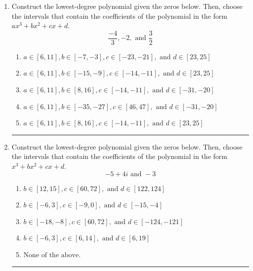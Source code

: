 \documentclass[14pt]{extbook}
\newcommand{\litem}[1]{\item#1\hspace*{-1cm}\rule{\textwidth}{0.4pt}}
\begin{document}
\begin{enumerate}
{\begin{enumerate}[label=\Alph*.]
\end{enumerate} }
\litem{
Construct the lowest-degree polynomial given the zeros below. Then, choose the intervals that contain the coefficients of the polynomial in the form $ax^3+bx^2+cx+d$.\[ \frac{-4}{3}, -2, \text{ and } \frac{3}{2} \]\begin{enumerate}[label=\Alph*.]
\item \( a \in [6, 11], b \in [-7, -3], c \in [-23, -21], \text{ and } d \in [23, 25] \)
\item \( a \in [6, 11], b \in [-15, -9], c \in [-14, -11], \text{ and } d \in [23, 25] \)
\item \( a \in [6, 11], b \in [8, 16], c \in [-14, -11], \text{ and } d \in [-31, -20] \)
\item \( a \in [6, 11], b \in [-35, -27], c \in [46, 47], \text{ and } d \in [-31, -20] \)
\item \( a \in [6, 11], b \in [8, 16], c \in [-14, -11], \text{ and } d \in [23, 25] \)

\end{enumerate} }
\litem{
Construct the lowest-degree polynomial given the zeros below. Then, choose the intervals that contain the coefficients of the polynomial in the form $x^3+bx^2+cx+d$.\[ -5 + 4 i \text{ and } -3 \]\begin{enumerate}[label=\Alph*.]
\item \( b \in [12, 15], c \in [60, 72], \text{ and } d \in [122, 124] \)
\item \( b \in [-6, 3], c \in [-9, 0], \text{ and } d \in [-15, -4] \)
\item \( b \in [-18, -8], c \in [60, 72], \text{ and } d \in [-124, -121] \)
\item \( b \in [-6, 3], c \in [6, 14], \text{ and } d \in [6, 19] \)
\item \( \text{None of the above.} \)


\end{enumerate}}
\end{enumerate}
\end{document}
